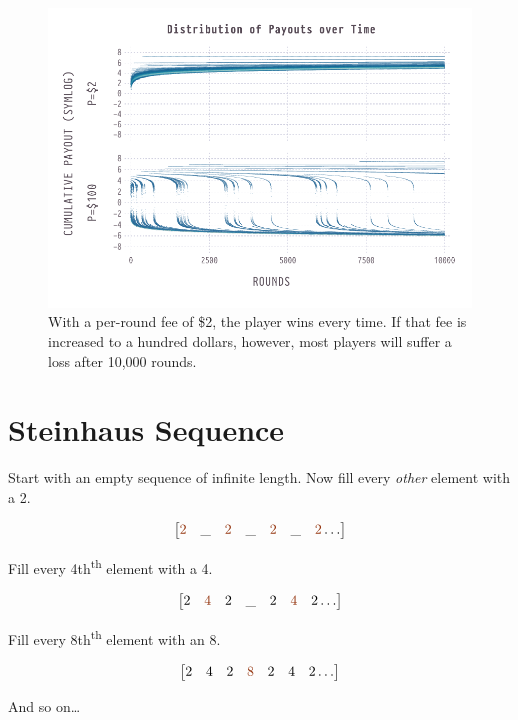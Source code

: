 \documentclass{article}
\begin{document}
\begin{figure}[htb]
  \centering
  \includegraphics[width=\textwidth]{winnings-2-100}
  \caption{With a per-round fee of \$2, the player wins every time. If that fee is increased to a hundred dollars, however, most players will suffer a loss after 10,000 rounds.}
  \label{fig:evolution}
\end{figure}

\begin{minipage}{\textwidth}
\section{Steinhaus Sequence}
Start with an empty sequence of infinite length. Now fill every \textit{other} element with a 2.

\[\begin{bmatrix}{\color{RawSienna} 2} & \_ & {\color{RawSienna} 2} & \_ & {\color{RawSienna} 2} & \_ & {\color{RawSienna} 2}\dots\end{bmatrix} \]

Fill every 4th\textsuperscript{th} element with a 4.

\[\begin{bmatrix}2 & {\color{RawSienna} 4} & 2 & \_ & 2 & {\color{RawSienna} 4} & 2\dots\end{bmatrix} \]

Fill every 8th\textsuperscript{th} element with an 8.

\[\begin{bmatrix}2 & 4 & 2 & {\color{RawSienna} 8} & 2 & 4 & 2\dots\end{bmatrix} \]

And so on\dots\\\\
\end{minipage}
\end{document}
